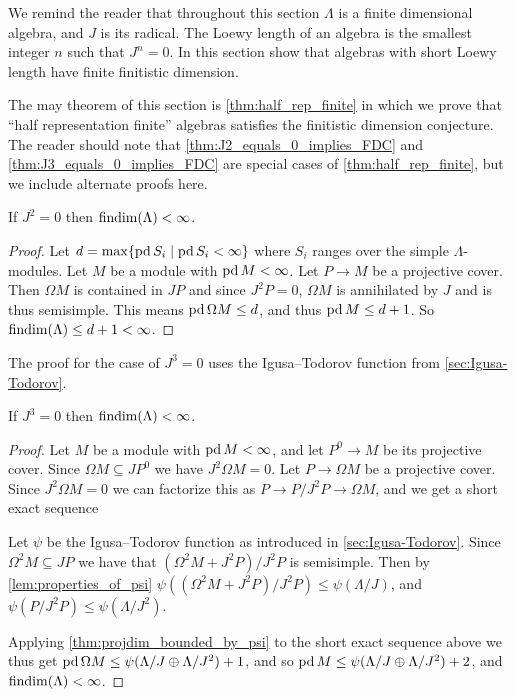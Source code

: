 We remind the reader that throughout this section $\Lambda$ is a finite dimensional algebra, and $J$ is its radical. The Loewy length of an algebra is the smallest integer $n$ such that $J^n = 0$. In this section show that algebras with short Loewy length have finite finitistic dimension.

The may theorem of this section is \cref{thm:half_rep_finite} in which we prove that ``half representation finite'' algebras satisfies the finitistic dimension conjecture. The reader should note that \cref{thm:J2_equals_0_implies_FDC} and \cref{thm:J3_equals_0_implies_FDC} are special cases of \cref{thm:half_rep_finite}, but we include alternate proofs here.

\begin{theorem}\label{thm:J2_equals_0_implies_FDC}
	If $J^2=0$ then $\operatorname{findim}(\Lambda) < \infty$.
	\begin{proof}
		Let $d = \max\{\operatorname{pd} S_i \mid \operatorname{pd} S_i < \infty\}$ where $S_i$ ranges over the simple $\Lambda$-modules. Let $M$ be a module with $\operatorname{pd} M < \infty$. Let $P \to M$ be a projective cover. Then $\Omega M$ is contained in $JP$ and since $J^2P=0$, $\Omega M$ is annihilated by $J$ and is thus semisimple. This means $\operatorname{pd} \Omega M \leq d$, and thus $\operatorname{pd} M \leq d+1$. So $\operatorname{findim}(\Lambda) \leq d+1 < \infty$.
	\end{proof}
\end{theorem}

The proof for the case of $J^3=0$ uses the Igusa--Todorov function from \cref{sec:Igusa-Todorov}.

\begin{theorem}\cite[Corollary~6]{IgTo05}\label{thm:J3_equals_0_implies_FDC}
	If $J^3=0$ then $\operatorname{findim}(\Lambda) < \infty$.
	\begin{proof}
		Let $M$ be a module with $\operatorname{pd} M < \infty$, and let $P^0 \to M$ be its projective cover. Since $\Omega M \subseteq JP^0$ we have $J^2\Omega M = 0$. Let $P \to \Omega M$ be a projective cover. Since $J^2\Omega M = 0$ we can factorize this as $P \to P/J^2P \to \Omega M$, and we get a short exact sequence
		\begin{center}
		\end{center}
		Let $\psi$ be the Igusa--Todorov function as introduced in \cref{sec:Igusa-Todorov}. Since $\Omega^2 M \subseteq JP$ we have that $(\Omega^2 M + J^2P) / J^2 P$ is semisimple. Then by \cref{lem:properties_of_psi} $\psi((\Omega^2 M + J^2P) / J^2 P) \leq \psi(\Lambda / J)$, and $\psi(P / J^2 P) \leq \psi(\Lambda / J^2)$.
		
		Applying \cref{thm:projdim_bounded_by_psi} to the short exact sequence above we thus get $\operatorname{pd} \Omega M \leq \psi(\Lambda / J \oplus \Lambda / J^2) + 1$, and so $\operatorname{pd} M \leq \psi(\Lambda / J \oplus \Lambda / J^2) + 2$, and $\operatorname{findim}(\Lambda) < \infty$.
	\end{proof}
\end{theorem}

